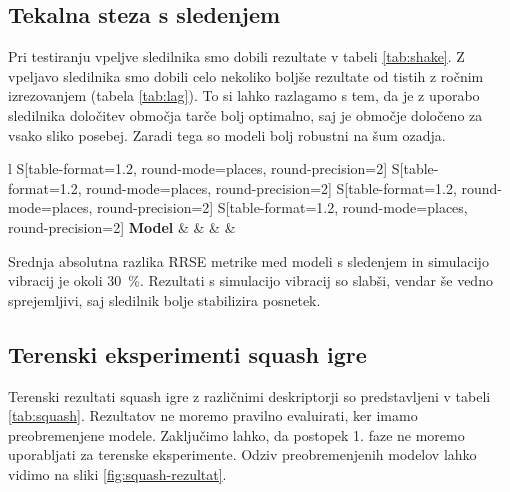 \subsection{Tekalna steza s sledenjem}
Pri testiranju vpeljve sledilnika smo dobili rezultate v tabeli \ref{tab:shake}. Z vpeljavo sledilnika smo dobili celo nekoliko boljše rezultate od tistih z ročnim izrezovanjem (tabela \ref{tab:lag}). To si lahko razlagamo s tem, da je z uporabo sledilnika določitev območja tarče bolj optimalno, saj je območje določeno za vsako sliko posebej. Zaradi tega so modeli bolj robustni na šum ozadja.




\begin{table}[!htbp]
	\centering
	\begin{tabular}{l S[table-format=1.2, round-mode=places, round-precision=2] S[table-format=1.2, round-mode=places, round-precision=2] S[table-format=1.2, round-mode=places, round-precision=2] S[table-format=1.2, round-mode=places, round-precision=2]}
		\toprule
		\textbf{Model} &  &  &  &  \\
		\midrule
		\bottomrule
	\end{tabular}
	\caption{Tracker normal and tracker shake}
	\label{tab:shake}
\end{table}


Srednja absolutna razlika RRSE metrike med modeli s sledenjem in simulacijo vibracij je okoli \SI{30}{\%}. Rezultati s simulacijo vibracij so slabši, vendar še vedno sprejemljivi, saj sledilnik bolje stabilizira posnetek.











\subsection{Terenski eksperimenti squash igre}
Terenski rezultati squash igre z različnimi deskriptorji so predstavljeni v tabeli \ref{tab:squash}.  Rezultatov ne moremo pravilno evaluirati, ker imamo preobremenjene modele. Zaključimo lahko, da postopek 1. faze ne moremo uporabljati za terenske eksperimente. Odziv preobremenjenih modelov lahko vidimo na sliki \ref{fig:squash-rezultat}.

